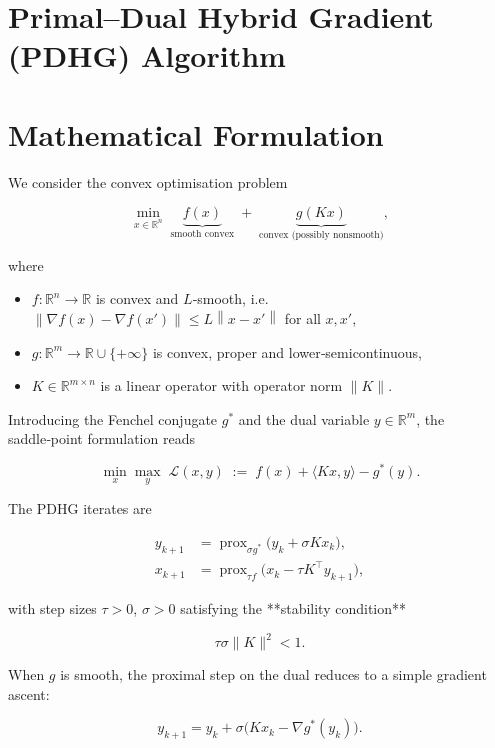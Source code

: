 \documentclass{article}
\newcommand{\norm}[1]{\left\lVert#1\right\rVert}
\begin{document}
\section*{Primal–Dual Hybrid Gradient (PDHG) Algorithm}

\section*{Mathematical Formulation}
We consider the convex optimisation problem  

\[
\min_{x\in\mathbb R^{n}} \; \underbrace{f(x)}_{\text{smooth convex}} \;+\; \underbrace{g(Kx)}_{\text{convex (possibly nonsmooth)}},
\tag{P}
\]

where  

\begin{itemize}
    \item $f:\mathbb R^{n}\to\mathbb R$ is convex and $L$‑smooth, i.e. 
          $\|\nabla f(x)-\nabla f(x')\|\le L\norm{x-x'}$ for all $x,x'$,
    \item $g:\mathbb R^{m}\to\mathbb R\cup\{+\infty\}$ is convex, proper and lower‑semicontinuous,
    \item $K\in\mathbb R^{m\times n}$ is a linear operator with operator norm $\|K\|$.
\end{itemize}

Introducing the Fenchel conjugate $g^{*}$ and the dual variable $y\in\mathbb R^{m}$, the saddle‑point formulation reads  

\[
\min_{x}\max_{y}\; \mathcal L(x,y)\;:=\; f(x)+\langle Kx,y\rangle-g^{*}(y).
\tag{1}
\]

The PDHG iterates are

\[
\boxed{
\begin{aligned}
y_{k+1} &= \operatorname{prox}_{\sigma g^{*}}\!\bigl(y_{k}+ \sigma K x_{k}\bigr), \tag{2a}\\[2mm]
x_{k+1} &= \operatorname{prox}_{\tau f}\!\bigl(x_{k}-\tau K^{\top} y_{k+1}\bigr), \tag{2b}
\end{aligned}}
\]

with step sizes $\tau>0$, $\sigma>0$ satisfying the **stability condition**

\[
\tau\sigma\|K\|^{2}<1.
\tag{3}
\]

When $g$ is smooth, the proximal step on the dual reduces to a simple gradient ascent:

\[
y_{k+1}= y_{k}+ \sigma\bigl(Kx_{k}-\nabla g^{*}(y_{k})\bigr).
\tag{4}
\]
\end{document}
